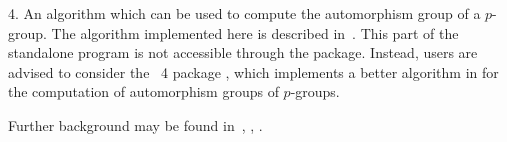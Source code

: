 \item{4.} 
An algorithm which can be used to compute the  automorphism  group  of  a
$p$-group. The algorithm implemented here is  described  in~\cite{OBr94}.
This part of  the  standalone  program  is  not  accessible  through  the
{\ANUPQ} package. Instead, users are advised  to  consider  the  {\GAP}~4
package {\AutPGrp}, which implements a better algorithm in {\GAP} for the
computation of automorphism groups of $p$-groups.

\endlist

Further   background   may   be   found   in~\cite{OBr95},   \cite{VL84},
\cite{NNN98}.

